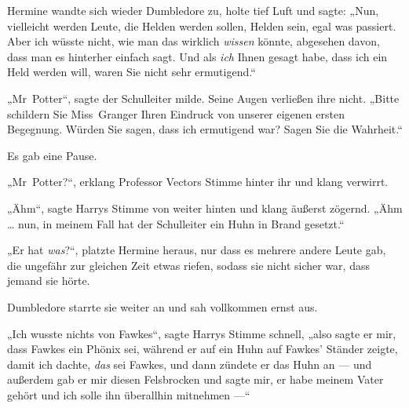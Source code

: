 Hermine wandte sich wieder Dumbledore zu, holte tief Luft und sagte:
„Nun, vielleicht werden Leute, die Helden werden sollen, Helden sein, egal was passiert. Aber ich wüsste nicht, wie man das wirklich \emph{wissen} könnte, abgesehen davon, dass man es hinterher einfach sagt. Und als \emph{ich} Ihnen gesagt habe, dass ich ein Held werden will, waren Sie nicht sehr ermutigend.“

„Mr~Potter“, sagte der Schulleiter milde. Seine Augen verließen ihre nicht.
„Bitte schildern Sie Miss~Granger Ihren Eindruck von unserer eigenen ersten Begegnung. Würden Sie sagen, dass ich ermutigend war? Sagen Sie die Wahrheit.“

Es gab eine Pause.

„Mr~Potter?“, erklang Professor Vectors Stimme hinter ihr und klang verwirrt.

„Ähm“, sagte Harrys Stimme von weiter hinten und klang äußerst zögernd. „Ähm … nun, in meinem Fall hat der Schulleiter ein Huhn in Brand gesetzt.“

„Er hat \emph{was}?“, platzte Hermine heraus, nur dass es mehrere andere Leute gab, die ungefähr zur gleichen Zeit etwas riefen, sodass sie nicht sicher war, dass jemand sie hörte.

Dumbledore starrte sie weiter an und sah vollkommen ernst aus.

„Ich wusste nichts von Fawkes“, sagte Harrys Stimme schnell, „also sagte er mir, dass Fawkes ein Phönix sei, während er auf ein Huhn auf Fawkes’ Ständer zeigte, damit ich dachte, \emph{das} sei Fawkes, und dann zündete er das Huhn an — und außerdem gab er mir diesen Felsbrocken und sagte mir, er habe meinem Vater gehört und ich solle ihn überallhin mitnehmen —“

